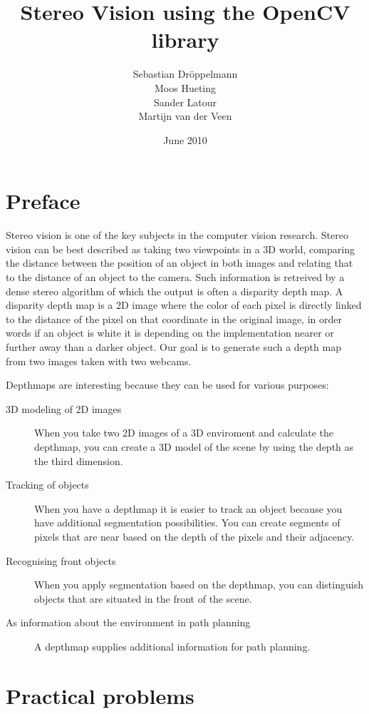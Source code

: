 \documentclass[a4paper]{article}
\title{Stereo Vision using the OpenCV library}
\author{Sebastian Dr\"oppelmann \\ Moos Hueting \\ Sander Latour \\ Martijn van der Veen}
\date{June 2010}
\begin{document}
\graphicspath{{./images/}}

\begin{titlepage}
  \maketitle
\end{titlepage}

\section{Preface}
Stereo vision is one of the key subjects in the computer vision research. Stereo vision can be best described as taking two viewpoints in a 3D world, comparing the distance between the position of an object in both images and relating that to the distance of an object to the camera. Such information is retreived by a dense stereo algorithm of which the output is often a disparity depth map. A disparity depth map is a 2D image where the color of each pixel is directly linked to the distance of the pixel on that coordinate in the original image, in order words if an object is white it is depending on the implementation nearer or further away than a darker object. Our goal is to generate such a depth map from two images taken with two webcams.

Depthmaps are interesting because they can be used for various purposes: 
\begin{description}
 \item[3D modeling of 2D images] When you take two 2D images of a 3D enviroment and calculate the depthmap, you can create a 3D model of the scene by using the depth as the third dimension.
 \item[Tracking of objects] When you have a depthmap it is easier to track an object because you have additional segmentation possibilities. You can create segments of pixels that are near based on the depth of the pixels and their adjacency.
 \item[Recognising front objects] When you apply segmentation based on the depthmap, you can distinguish objects that are situated in the front of the scene.
 \item[As information about the environment in path planning] A depthmap supplies additional information for path planning.
\end{description}

\section{Practical problems}
\end{document}
